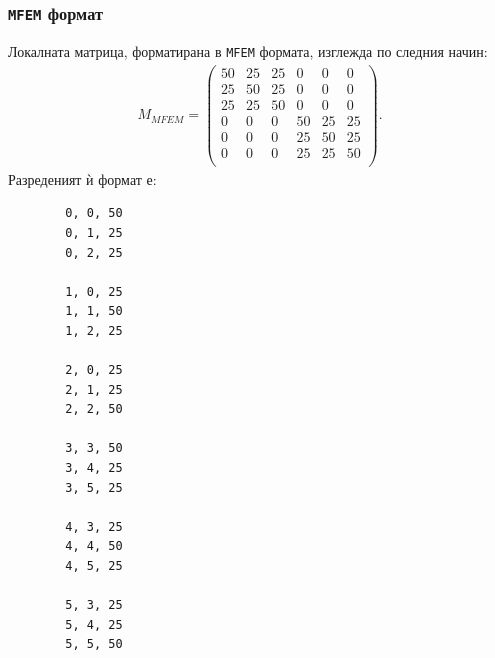 \documentclass{report}
\begin{document}
	\subsubsection{\texttt{MFEM} формат}
	Локалната матрица, форматирана в \texttt{MFEM} формата, изглежда по следния начин:
	\begin{align*}
		M_{MFEM} = \begin{pmatrix}
			50 & 25 & 25 & 0 & 0 & 0\\
			25& 50 & 25 & 0 & 0 & 0\\
			25 & 25 & 50 & 0 & 0 & 0\\
			0 & 0 & 0 & 50 & 25 & 25\\
			0 & 0 & 0 & 25 & 50 & 25\\
			0 & 0 & 0 & 25 & 25 & 50\\
		\end{pmatrix}.
	\end{align*}
	Разреденият ѝ формат е:
	\begin{verbatim}
		0, 0, 50
		0, 1, 25
		0, 2, 25
		
		1, 0, 25
		1, 1, 50
		1, 2, 25
		
		2, 0, 25
		2, 1, 25
		2, 2, 50
		
		3, 3, 50
		3, 4, 25
		3, 5, 25
		
		4, 3, 25
		4, 4, 50
		4, 5, 25
		
		5, 3, 25
		5, 4, 25
		5, 5, 50
	\end{verbatim}
	
\end{document}
